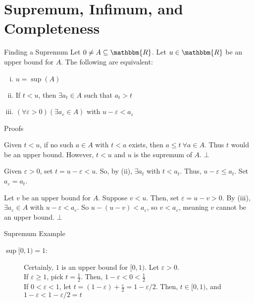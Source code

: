 \documentclass[10pt]{extarticle}
\newcommand{\R}{\mathbbm{R}}
\begin{document}
  \section*{Supremum, Infimum, and Completeness}%
  \begin{problem}{Finding a Supremum}
    Let $0\neq A\subseteq \R$. Let $u\in\R$ be an upper bound for $A$. The following are equivalent:
    \begin{enumerate}[(i)]
      \item $u=\sup(A)$
      \item If $t<u$, then $\exists a_t\in A$ such that $a_t > t$
      \item $(\forall \varepsilon > 0)(\exists a_{\varepsilon}\in A)$ with $u-\varepsilon < a_{\varepsilon}$
    \end{enumerate}
    \begin{problem}{Proofs}
      \begin{description}[font=\normalfont]
        \item[(i) $\Rightarrow$ (ii):] Given $t < u$, if no such $a\in A$ with $t < a$ exists, then $a \leq t~\forall a\in A$. Thus $t$ would be an upper bound. However, $t < u$ and $u$ is the supremum of $A$. $\bot$
        \item[(ii) $\Rightarrow$ (iii):] Given $\varepsilon > 0$, set $t = u-\varepsilon < u$. So, by (ii), $\exists a_t$ with $t < a_t$. Thus, $u-\varepsilon \leq a_t$. Set $a_{\varepsilon} = a_t$.
        \item[(iii) $\Rightarrow$ (i):] Let $v$ be an upper bound for $A$. Suppose $v < u$. Then, set $\varepsilon = u-v > 0$. By (iii), $\exists a_{\varepsilon}\in A$ with $u-\varepsilon < a_{\varepsilon}$. So $u-(u-v) < a_{\varepsilon}$, so $v < a_{\varepsilon}$, meaning $v$ cannot be an upper bound. $\bot$
      \end{description}
    \end{problem}
  \end{problem}
  \begin{problem}{Supremum Example}
    \begin{description}
      \item[$\sup [0,1) = 1$:] Certainly, $1$ is an upper bound for $[0,1)$. Let $\varepsilon > 0$.\\

        If $\varepsilon \geq 1$, pick $t = \frac{1}{2}$. Then, $1-\varepsilon < 0 < \frac{1}{2}$\\

        If $0 < \varepsilon < 1$, let $t = (1-\varepsilon) + \frac{\varepsilon}{2} = 1-\varepsilon/2$. Then, $t\in [0,1)$, and $1-\varepsilon < 1-\varepsilon/2 = t$
    \end{description}
  \end{problem}
\end{document}
